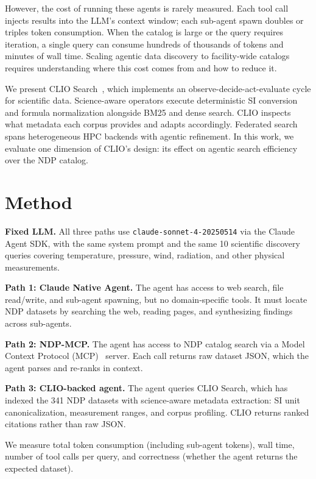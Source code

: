 \documentclass[conference]{IEEEtran}
\begin{document}
However, the cost of running these agents is rarely measured. Each tool
call injects results into the LLM's context window; each sub-agent spawn
doubles or triples token consumption. When the catalog is large or the
query requires iteration, a single query can consume hundreds of
thousands of tokens and minutes of wall time. Scaling agentic data
discovery to facility-wide catalogs requires understanding where this
cost comes from and how to reduce it.

We present CLIO Search~\cite{clio2026}, which implements an
observe-decide-act-evaluate cycle for scientific data. Science-aware
operators execute deterministic SI conversion and formula normalization
alongside BM25 and dense search. CLIO inspects what metadata each corpus
provides and adapts accordingly. Federated search spans heterogeneous
HPC backends with agentic refinement. In this work, we evaluate one
dimension of CLIO's design: its effect on agentic search efficiency over
the NDP catalog.

\section{Method}

\textbf{Fixed LLM.} All three paths use
\texttt{claude-sonnet-4-20250514} via the Claude Agent SDK, with the
same system prompt and the same 10 scientific discovery queries covering
temperature, pressure, wind, radiation, and other physical measurements.

\textbf{Path 1: Claude Native Agent.} The agent has access to web
search, file read/write, and sub-agent spawning, but no domain-specific
tools. It must locate NDP datasets by searching the web, reading pages,
and synthesizing findings across sub-agents.

\textbf{Path 2: NDP-MCP.} The agent has access to NDP catalog search
via a Model Context Protocol (MCP)~\cite{mcp2024} server. Each call
returns raw dataset JSON, which the agent parses and re-ranks in context.

\textbf{Path 3: CLIO-backed agent.} The agent queries CLIO Search,
which has indexed the 341 NDP datasets with science-aware metadata
extraction: SI unit canonicalization, measurement ranges, and corpus
profiling. CLIO returns ranked citations rather than raw JSON.

We measure total token consumption (including sub-agent tokens), wall
time, number of tool calls per query, and correctness (whether the agent
returns the expected dataset).
\end{document}
